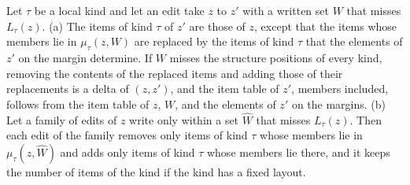 \lemma[Localization]
\label{lem:fw:localization}
{
Let $\tau$ be a local kind and let an edit take $z$ to $z'$ with a written set $W$ that misses $L_\tau(z)$.
(a) The items of kind $\tau$ of $z'$ are those of $z$, except that the items whose members lie in
$\mu_\tau(z, W)$ are replaced by the items of kind $\tau$ that the elements of $z'$ on the margin determine. If $W$
misses the structure positions of every kind, removing the contents of the replaced items and adding those of their
replacements is a delta of $(z, z')$, and the item table of $z'$, members included, follows from the item table of
$z$, $W$, and the elements of $z'$ on the margins.
(b) Let a family of edits of $z$ write only within a set $\hat{W}$ that misses $L_\tau(z)$. Then each edit of the
family removes only items of kind $\tau$ whose members lie in $\mu_\tau(z, \hat{W})$ and adds only items of kind $\tau$
whose members lie there, and it keeps the number of items of the kind if the kind has a fixed layout.
}

